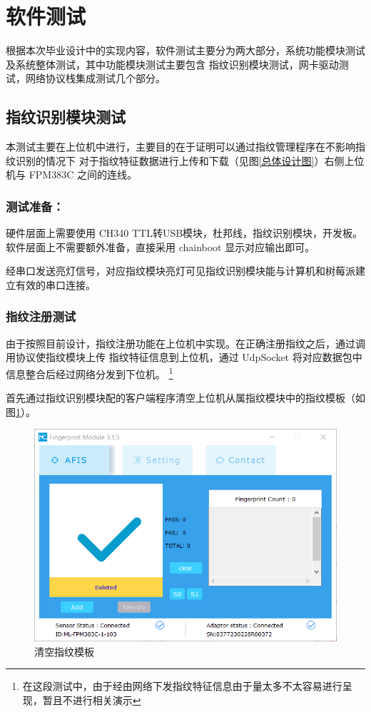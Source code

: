 \section{软件测试}

    根据本次毕业设计中的实现内容，软件测试主要分为两大部分，系统功能模块测试及系统整体测试，其中功能模块测试主要包含
    指纹识别模块测试，网卡驱动测试，网络协议栈集成测试几个部分。

    \subsection{指纹识别模块测试}

    本测试主要在上位机中进行，主要目的在于证明可以通过指纹管理程序在不影响指纹识别的情况下
    对于指纹特征数据进行上传和下载（见图\ref{总体设计图}）右侧上位机与 FPM383C 之间的连线。

    \subsubsection*{测试准备：}
    硬件层面上需要使用 CH340 TTL转USB模块，杜邦线，指纹识别模块，开发板。
    软件层面上不需要额外准备，直接采用 chainboot 显示对应输出即可。

    经串口发送亮灯信号，对应指纹模块亮灯可见指纹识别模块能与计算机和树莓派建立有效的串口连接。

    \subsubsection{指纹注册测试}
    
    由于按照目前设计，指纹注册功能在上位机中实现。在正确注册指纹之后，通过调用协议使指纹模块上传
    指纹特征信息到上位机，通过 UdpSocket 将对应数据包中信息整合后经过网络分发到下位机。
    \footnote{在这段测试中，由于经由网络下发指纹特征信息由于量太多不太容易进行呈现，暂且不进行相关演示}

    首先通过指纹识别模块配的客户端程序清空上位机从属指纹模块中的指纹模板（如图\ref{fig::清空指纹模板}）。

    \begin{figure}[ht]
        \centering
        \caption{清空指纹模板}    \label{fig::清空指纹模板}
        \includegraphics[scale=0.8]{./imgs/清空指纹模板.png}
    \end{figure}

